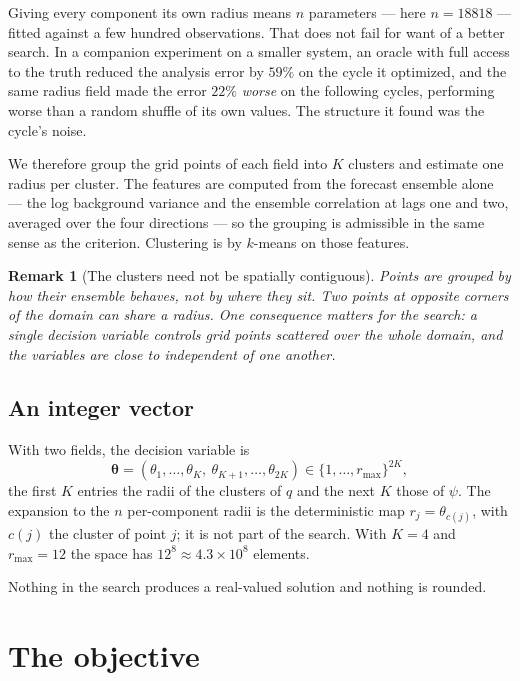 \documentclass[11pt,a4paper]{article}
\newtheorem{remark}{Remark}
\theoremstyle{definition}
\begin{document}
Giving every component its own radius means $n$ parameters --- here $n = 18818$
--- fitted against a few hundred observations. That does not fail for want of a
better search. In a companion experiment on a smaller system, an oracle with
full access to the truth reduced the analysis error by $59\%$ on the cycle it
optimized, and the same radius field made the error $22\%$ \emph{worse} on the
following cycles, performing worse than a random shuffle of its own values. The
structure it found was the cycle's noise.

We therefore group the grid points of each field into $K$ clusters and estimate
one radius per cluster. The features are computed from the forecast ensemble
alone --- the log background variance and the ensemble correlation at lags one
and two, averaged over the four directions --- so the grouping is admissible in
the same sense as the criterion. Clustering is by $k$-means on those features.

\begin{remark}[The clusters need not be spatially contiguous]
Points are grouped by how their ensemble behaves, not by where they sit. Two
points at opposite corners of the domain can share a radius. One consequence
matters for the search: a single decision variable controls grid points
scattered over the whole domain, and the variables are close to independent of
one another.
\end{remark}

\subsection{An integer vector}

With two fields, the decision variable is
%
\begin{equation}
  \boldsymbol{\theta}
  = (\theta_1, \dots, \theta_K,\ \theta_{K+1}, \dots, \theta_{2K})
  \in \{1, \dots, r_{\max}\}^{2K},
\end{equation}
%
the first $K$ entries the radii of the clusters of $q$ and the next $K$ those of
$\psi$. The expansion to the $n$ per-component radii is the deterministic map
$r_j = \theta_{c(j)}$, with $c(j)$ the cluster of point $j$; it is not part of
the search. With $K = 4$ and $r_{\max} = 12$ the space has $12^{8} \approx
4.3 \times 10^{8}$ elements.

Nothing in the search produces a real-valued solution and nothing is rounded.

\section{The objective}
\end{document}

